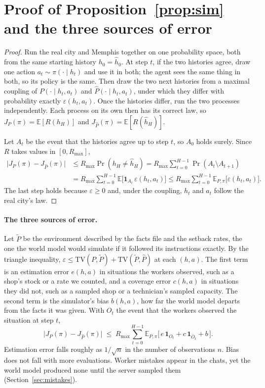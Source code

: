 \documentclass[10pt]{article}
\begin{document}
\section{Proof of Proposition~\ref{prop:sim} and the three sources of error}
\label{app:proof}

\begin{proof}
Run the real city and Memphis together on one probability space, both from the same starting history $h_0 = \hat h_0$. At step
$t$, if the two histories agree, draw one action $a_t \sim \pi(\cdot \mid h_t)$ and use it in both; the agent sees the same thing in
both, so its policy is the same. Then draw the two next histories from a maximal coupling of $P(\cdot \mid h_t, a_t)$ and
$\hat P(\cdot \mid h_t, a_t)$, under which they differ with probability exactly $\varepsilon(h_t, a_t)$. Once the histories differ,
run the two processes independently. Each process on its own then has its correct law, so $J_P(\pi) = \mathbb{E}[R(h_H)]$ and
$J_{\hat P}(\pi) = \mathbb{E}[R(\hat h_H)]$.

Let $A_t$ be the event that the histories agree up to step $t$, so $A_0$ holds surely. Since $R$ takes values in $[0, R_{\max}]$,
\begin{align*}
  \big|J_P(\pi) - J_{\hat P}(\pi)\big| &\le R_{\max} \Pr(h_H \ne \hat h_H) = R_{\max} \sum_{t=0}^{H-1} \Pr(A_t \setminus A_{t+1}) \\
  &= R_{\max} \sum_{t=0}^{H-1} \mathbb{E}\big[\mathbf{1}_{A_t}\, \varepsilon(h_t, a_t)\big]
  \le R_{\max} \sum_{t=0}^{H-1} \mathbb{E}_{P,\pi}\big[\varepsilon(h_t, a_t)\big].
\end{align*}
The last step holds because $\varepsilon \ge 0$ and, under the coupling, $h_t$ and $a_t$ follow the real city's law.
\end{proof}

\paragraph{The three sources of error.} Let $\tilde P$ be the environment described by the facts file and the setback rates, the one
the world model would simulate if it followed its instructions exactly. By the triangle inequality, $\varepsilon \le \mathrm{TV}(P, \tilde P) + \mathrm{TV}(\tilde P, \hat P)$ at each $(h,a)$.
The first term is an estimation error $e(h,a)$ in situations the workers observed, such as a shop's stock or a rate we counted, and
a coverage error $c(h,a)$ in situations they did not, such as a sampled shop or a technician's sampled capacity. The second term is the simulator's bias $b(h,a)$, how far the world model departs from the facts it was given.
With $O_t$ the event that the workers observed the situation at step $t$,
\begin{equation}
  \big|J_P(\pi) - J_{\hat P}(\pi)\big| \;\le\; R_{\max} \sum_{t=0}^{H-1}
  \mathbb{E}_{P,\pi}\big[\, e\,\mathbf{1}_{O_t} + c\,\mathbf{1}_{\bar O_t} + b \,\big].
  \label{eq:split}
\end{equation}
Estimation error falls roughly as $1/\sqrt{n}$ in the number of observations $n$. Bias does not fall with more evaluations. Worker
mistakes appear in the chats, yet the world model produced none until the server sampled them (Section~\ref{sec:mistakes}).
\end{document}
